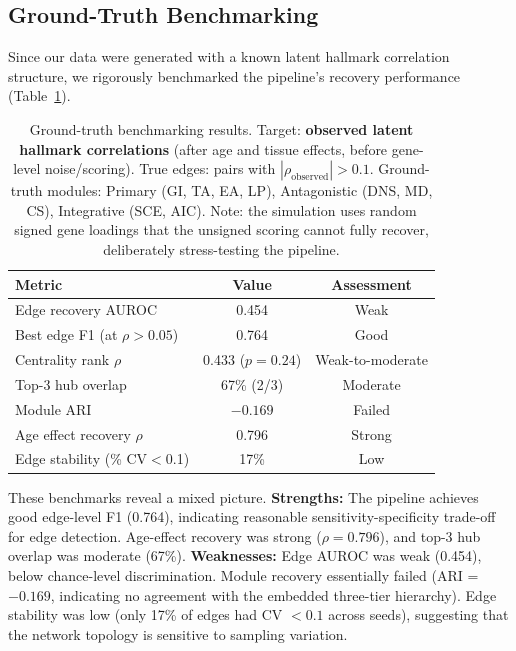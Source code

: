 \documentclass[11pt,a4paper]{article}
\begin{document}
\subsection{Ground-Truth Benchmarking}

Since our data were generated with a known latent hallmark correlation structure, we rigorously benchmarked the pipeline's recovery performance (Table~\ref{tab:benchmarks}).

\begin{table}[H]
\centering
\caption{Ground-truth benchmarking results. Target: \textbf{observed latent hallmark correlations} (after age and tissue effects, before gene-level noise/scoring). True edges: pairs with $|\rho_{\text{observed}}| > 0.1$. Ground-truth modules: Primary (GI, TA, EA, LP), Antagonistic (DNS, MD, CS), Integrative (SCE, AIC). Note: the simulation uses random signed gene loadings that the unsigned scoring cannot fully recover, deliberately stress-testing the pipeline.}
\label{tab:benchmarks}
\small
\begin{tabular}{lcc}
\toprule
\textbf{Metric} & \textbf{Value} & \textbf{Assessment} \\
\midrule
Edge recovery AUROC & 0.454 & Weak \\
Best edge F1 (at $\rho > 0.05$) & 0.764 & Good \\
Centrality rank $\rho$ & 0.433 ($p = 0.24$) & Weak-to-moderate \\
Top-3 hub overlap & 67\% (2/3) & Moderate \\
Module ARI & $-0.169$ & Failed \\
Age effect recovery $\rho$ & 0.796 & Strong \\
Edge stability (\% CV$<$0.1) & 17\% & Low \\
\bottomrule
\end{tabular}
\end{table}

\noindent
These benchmarks reveal a mixed picture. \textbf{Strengths:} The pipeline achieves good edge-level F1 (0.764), indicating reasonable sensitivity-specificity trade-off for edge detection. Age-effect recovery was strong ($\rho = 0.796$), and top-3 hub overlap was moderate (67\%). \textbf{Weaknesses:} Edge AUROC was weak (0.454), below chance-level discrimination. Module recovery essentially failed (ARI = $-0.169$, indicating no agreement with the embedded three-tier hierarchy). Edge stability was low (only 17\% of edges had CV $< 0.1$ across seeds), suggesting that the network topology is sensitive to sampling variation.
\end{document}
